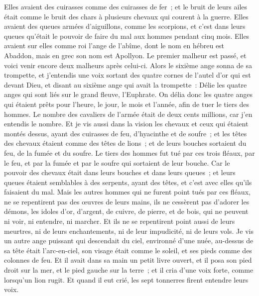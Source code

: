 \begin{multicols}{2}
Elles avaient des cuirasses comme des cuirasses de fer~; et le bruit de leurs ailes était comme le bruit des chars à plusieurs chevaux qui courent à la guerre.
Elles avaient des queues armées d'aiguillons, comme les scorpions, et c'est dans leurs queues qu'était le pouvoir de faire du mal aux hommes pendant cinq mois.
Elles avaient sur elles comme roi l'ange de l'abîme, dont le nom en hébreu est Abaddon, mais en grec son nom est Apollyon.
Le premier malheur est passé, et voici venir encore deux malheurs après celui-ci.
Alors le sixième ange sonna de sa trompette, et j'entendis une voix sortant des quatre cornes de l'autel d'or qui est devant Dieu,
et disant au sixième ange qui avait la trompette~: Délie les quatre anges qui sont liés sur le grand fleuve, l'Euphrate.
On délia donc les quatre anges qui étaient prêts pour l'heure, le jour, le mois et l'année, afin de tuer le tiers des hommes.
Le nombre des cavaliers de l'armée était de deux cents millions, car j'en entendis le nombre.
Et je vis aussi dans la vision les chevaux et ceux qui étaient montés dessus, ayant des cuirasses de feu, d'hyacinthe et de soufre~; et les têtes des chevaux étaient comme des têtes de lions~; et de leurs bouches sortaient du feu, de la fumée et du soufre.
Le tiers des hommes fut tué par ces trois fléaux, par le feu, et par la fumée et par le soufre qui sortaient de leur bouche.
Car le pouvoir des chevaux était dans leurs bouches et dans leurs queues~; et leurs queues étaient semblables à des serpents, ayant des têtes, et c'est avec elles qu'ils faisaient du mal.
Mais les autres hommes qui ne furent point tués par ces fléaux, ne se repentirent pas des œuvres de leurs mains, ils ne cessèrent pas d'adorer les démons, les idoles d'or, d'argent, de cuivre, de pierre, et de bois, qui ne peuvent ni voir, ni entendre, ni marcher.
Et ils ne se repentirent point aussi de leurs meurtres, ni de leurs enchantements, ni de leur impudicité, ni de leurs vols.
\VerseOne{}Je vis un autre ange puissant qui descendait du ciel, environné d'une nuée, au-dessus de sa tête était l'arc-en-ciel, son visage était comme le soleil, et ses pieds comme des colonnes de feu.
Et il avait dans sa main un petit livre ouvert, et il posa son pied droit sur la mer, et le pied gauche sur la terre~;
et il cria d'une voix forte, comme lorsqu'un lion rugit. Et quand il eut crié, les sept tonnerres firent entendre leurs voix.

\end{multicols}

